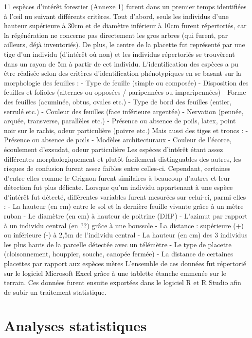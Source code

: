 \documentclass[
  
  
  
  
  ]{book}
\begin{document}
11 espèces d'intérêt forestier (Annexe 1) furent dans un premier temps identifiées à l'œil nu suivant différents critères.
Tout d'abord, seuls les individus d'une hauteur supérieure à 30cm et de diamètre inférieur à 10cm furent répertoriés, car la régénération ne concerne pas directement les gros arbres (qui furent, par ailleurs, déjà inventoriés). De plus, le centre de la placette fut représenté par une tige d'un individu (d'intérêt où non) et les individus répertoriés se trouvèrent dans un rayon de 5m à partir de cet individu.
L'identification des espèces a pu être réalisée selon des critères d'identification phénotypiques en se basant sur la morphologie des feuilles :
- Type de feuille (simple ou composée)
- Disposition des feuilles et folioles (alternes ou opposées / paripennées ou imparipennées)
- Forme des feuilles (acuminée, obtus, ovales etc.)
- Type de bord des feuilles (entier, serrulé etc.)
- Couleur des feuilles (face inférieure argentée)
- Nervation (pennée, arquée, transverse, parallèles etc.)
- Présence ou absence de poils, latex, point noir sur le rachis, odeur particulière (poivre etc.)
Mais aussi des tiges et troncs :
- Présence ou absence de poils
- Modèles architecturaux
- Couleur de l'écorce, écoulement d'exsudat, odeur particulière
Les espèces d'intérêt étant assez différentes morphologiquement et plutôt facilement distinguables des autres, les risques de confusion furent assez faibles entre celles-ci. Cependant, certaines d'entre elles comme le Grignon furent similaires à beaucoup d'autres et leur détection fut plus délicate.
Lorsque qu'un individu appartenant à une espèce d'intérêt fut détecté, différentes variables furent mesurées sur celui-ci, parmi elles :
- La hauteur (en cm) entre le sol et la dernière feuille vivante grâce à un mètre ruban
- Le diamètre (en cm) à hauteur de poitrine (DHP)
- L'azimut par rapport à un individu central (en ??) grâce à une boussole
- La distance : supérieure (+) ou inférieure (-) à 2,5m de l'individu central
- La hauteur (en cm) des 3 individus les plus hauts de la parcelle détectée avec un télémètre
- Le type de placette (cloisonnement, houppier, souche, canopée fermée)
- La distance de certaines placettes par rapport aux espèces mères
L'ensemble de ces données fut répertorié sur le logiciel Microsoft Excel grâce à une tablette étanche emmenée sur le terrain. Ces données furent ensuite exportées dans le logiciel R et R Studio afin de subir un traitement statistique.

\hypertarget{analyses-statistiques}{%
\section{Analyses statistiques}\label{analyses-statistiques}}
\end{document}

